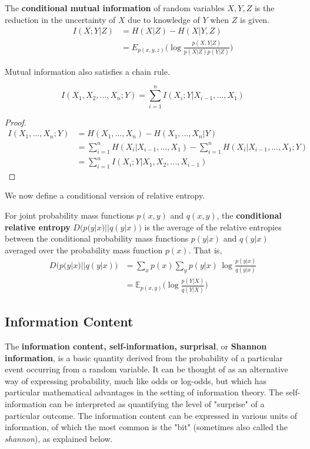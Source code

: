 \documentclass{article}
\begin{document}
  \begin{definition}
  The \textbf{conditional mutual information} of random variables $X, Y, Z$ is the reduction in the uncertainty of $X$ due to knowledge of $Y$ when $Z$ is given. 
  \begin{align*}
      I(X;Y|Z) & = H(X|Z) - H(X|Y, Z) \\
      & = E_{p(x, y, z)} \bigg( \log \frac{p(X, Y|Z)}{p(X|Z) p(Y|Z)}\bigg)
  \end{align*}
  \end{definition}

  Mutual information also satisfies a chain rule. 

  \begin{theorem}
  \[I(X_1, X_2, ..., X_n; Y) = \sum_{i=1}^n I(X_i;Y|X_{i-1}, ..., X_1)\]
  \end{theorem}
  \begin{proof}
  \begin{align*}
      I(X_1, ..., X_n;Y) & = H(X_1, ..., X_n) - H(X_1, ..., X_n |Y) \\
      & = \sum_{i=1}^n H(X_i|X_{i-1}, ..., X_1) - \sum_{i=1}^n H(X_i | X_{i-1}, ..., X_1;Y) \\
      & = \sum_{i=1}^n I(X_i ; Y|X_1, X_2, ..., X_{i-1})
  \end{align*}
  \end{proof}

  We now define a conditional version of relative entropy.

  \begin{definition}
  For joint probability mass functions $p(x, y)$ and $q(x, y)$, the \textbf{conditional relative entropy} $D\big( p(y|x) || q(y|x)\big)$ is the average of the relative entropies between the conditional probability mass functions $p(y|x)$ and $q(y|x)$ averaged over the probability mass function $p(x)$. That is, 
  \begin{align*}
      D\big(p(y|x)||q(y|x)\big) & = \sum_x p(x) \sum_y p(y|x) \, \log \frac{p(y|x)}{q(y|x)} \\
      & = \mathbb{E}_{p(x, y)} \bigg( \log \frac{p(Y|X)}{q(Y|X)} \bigg) 
  \end{align*}
  \end{definition}

  \subsection{Information Content}
  The \textbf{information content, self-information, surprisal}, or \textbf{Shannon information}, is a basic quantity derived from the probability of a particular event occurring from a random variable. It can be thought of as an alternative way of expressing probability, much like odds or log-odds, but which has particular mathematical advantages in the setting of information theory. The self-information can be interpreted as quantifying the level of "surprise" of a particular outcome. The information content can be expressed in various units of information, of which the most common is the "bit" (sometimes also called the \textit{shannon}), as explained below. 
\end{document}
